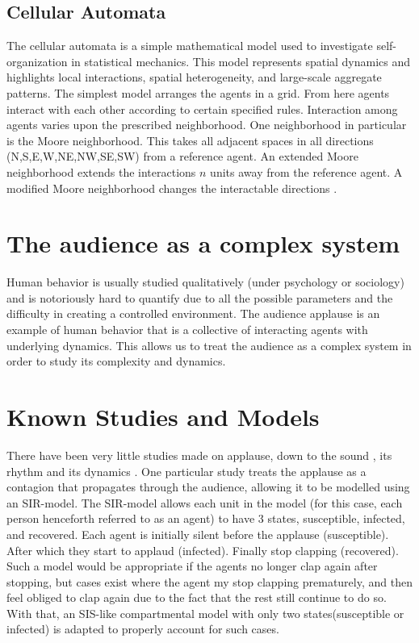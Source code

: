 \subsection{Cellular Automata}
The cellular automata is a simple mathematical model used to investigate self-organization in statistical mechanics. 
This model represents spatial dynamics and highlights local interactions, spatial heterogeneity, and large-scale aggregate patterns.
The simplest model arranges the agents in a grid.
From here agents interact with each other according to certain specified rules.
Interaction among agents varies upon the prescribed neighborhood.
One neighborhood in particular is the Moore neighborhood.
This takes all adjacent spaces in all directions (N,S,E,W,NE,NW,SE,SW) from a reference agent.
An extended Moore neighborhood extends the interactions $n$ units away from the reference agent.
A modified Moore neighborhood changes the interactable directions \cite{Moore}.

\section{The audience as a complex system}
\hspace{\parindent} Human behavior is usually studied qualitatively (under psychology or sociology) and is notoriously hard to quantify due to all the possible parameters and the difficulty in creating a controlled environment.
The audience applause is an example of human behavior that is a collective of interacting agents with underlying dynamics.
This allows us to treat the audience as a complex system in order to study its complexity and dynamics.
 

\section{Known Studies and Models}
There have been very little studies made on applause, down to the sound \cite{soundofhands}, its rhythm \cite{rhythm} and its dynamics \cite{Mann20130466}. 
One particular study treats the applause as a contagion that propagates through the audience, allowing it to be modelled using an SIR-model.
The SIR-model allows each unit in the model (for this case, each person henceforth referred to as an agent) to have 3 states, susceptible, infected, and recovered. 
Each agent is initially silent before the applause (susceptible).
After which they start to applaud (infected).
Finally stop clapping (recovered).
Such a model would be appropriate if the agents no longer clap again after stopping, but cases exist where the agent my stop clapping prematurely, and then feel obliged to clap again due to the fact that the rest still continue to do so.
With that, an SIS-like compartmental model with only two states(susceptible or infected) is adapted to properly account for such cases.

